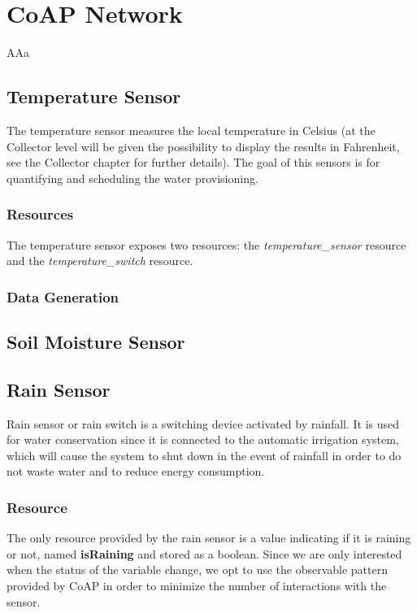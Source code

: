 \section{CoAP Network}
AAa

\subsection{Temperature Sensor}
The temperature sensor measures the local temperature in Celsius (at the Collector level will be given the possibility to display the results in Fahrenheit, see the Collector chapter for further details). The goal of this sensors is for quantifying and scheduling the water provisioning.

\subsubsection{Resources}
The temperature sensor exposes two resources: the \textit{temperature\_sensor} resource and the \textit{temperature\_switch} resource.



\subsubsection{Data Generation}





\subsection{Soil Moisture Sensor}










\subsection{Rain Sensor}
Rain sensor or rain switch is a switching device activated by rainfall. It is used for water conservation since it is connected to the automatic irrigation system, which will cause the system to shut down in the event of rainfall in order to do not waste water and to reduce energy consumption.

\subsubsection{Resource}
The only resource provided by the rain sensor is a value indicating if it is raining or not, named \textbf{isRaining} and stored as a boolean. Since we are only interested when the status of the variable change, we opt to use the observable pattern provided by CoAP in order to minimize the number of interactions with the sensor.

